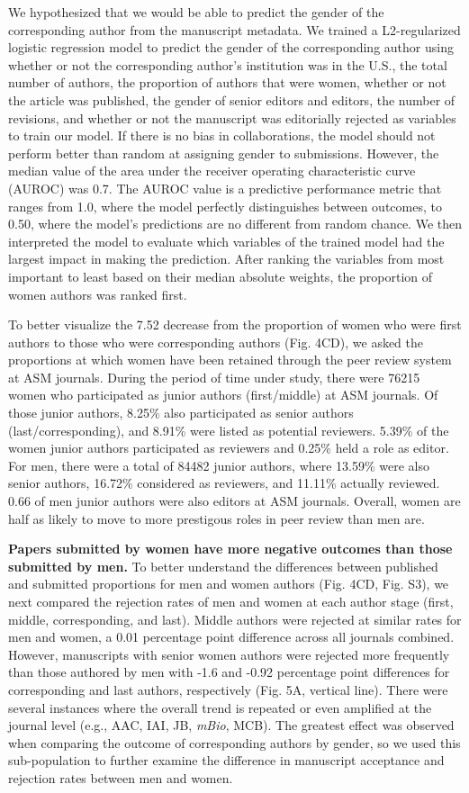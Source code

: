 \documentclass[11pt,]{article}
\begin{document}
We hypothesized that we would be able to predict the gender of the
corresponding author from the manuscript metadata. We trained a
L2-regularized logistic regression model to predict the gender of the
corresponding author using whether or not the corresponding author's
institution was in the U.S., the total number of authors, the proportion
of authors that were women, whether or not the article was published,
the gender of senior editors and editors, the number of revisions, and
whether or not the manuscript was editorially rejected as variables to
train our model. If there is no bias in collaborations, the model should
not perform better than random at assigning gender to submissions.
However, the median value of the area under the receiver operating
characteristic curve (AUROC) was 0.7. The AUROC value is a predictive
performance metric that ranges from 1.0, where the model perfectly
distinguishes between outcomes, to 0.50, where the model's predictions
are no different from random chance. We then interpreted the model to
evaluate which variables of the trained model had the largest impact in
making the prediction. After ranking the variables from most important
to least based on their median absolute weights, the proportion of women
authors was ranked first.

To better visualize the 7.52 decrease from the proportion of women who
were first authors to those who were corresponding authors (Fig. 4CD),
we asked the proportions at which women have been retained through the
peer review system at ASM journals. During the period of time under
study, there were 76215 women who participated as junior authors
(first/middle) at ASM journals. Of those junior authors, 8.25\% also
participated as senior authors (last/corresponding), and 8.91\% were
listed as potential reviewers. 5.39\% of the women junior authors
participated as reviewers and 0.25\% held a role as editor. For men,
there were a total of 84482 junior authors, where 13.59\% were also
senior authors, 16.72\% considered as reviewers, and 11.11\% actually
reviewed. 0.66 of men junior authors were also editors at ASM journals.
Overall, women are half as likely to move to more prestigous roles in
peer review than men are.

\textbf{Papers submitted by women have more negative outcomes than those
submitted by men.} To better understand the differences between
published and submitted proportions for men and women authors (Fig. 4CD,
Fig. S3), we next compared the rejection rates of men and women at each
author stage (first, middle, corresponding, and last). Middle authors
were rejected at similar rates for men and women, a 0.01 percentage
point difference across all journals combined. However, manuscripts with
senior women authors were rejected more frequently than those authored
by men with -1.6 and -0.92 percentage point differences for
corresponding and last authors, respectively (Fig. 5A, vertical line).
There were several instances where the overall trend is repeated or even
amplified at the journal level (e.g., AAC, IAI, JB, \emph{mBio}, MCB).
The greatest effect was observed when comparing the outcome of
corresponding authors by gender, so we used this sub-population to
further examine the difference in manuscript acceptance and rejection
rates between men and women.
\end{document}
